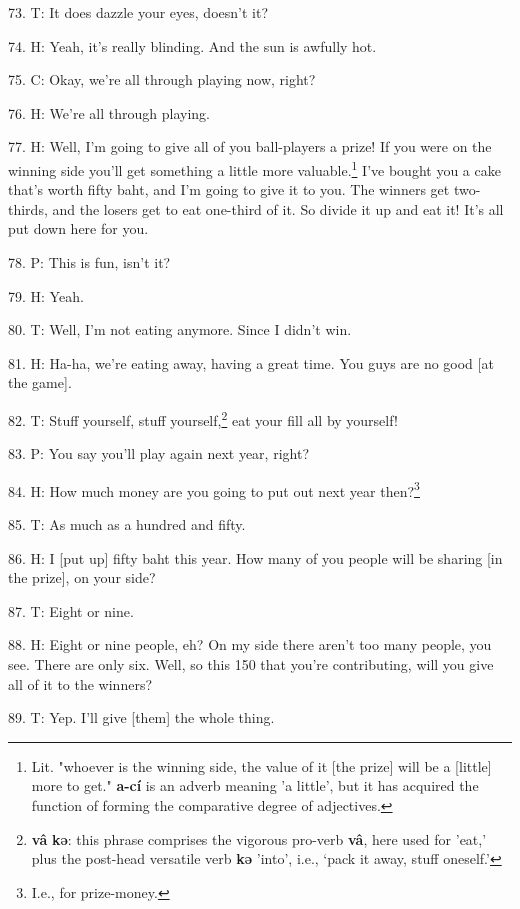 73. T:  It does
dazzle your eyes, doesn't it?

74. H: Yeah, it's really blinding. And the sun is awfully hot.

75. C: Okay, we're all through playing now, right?

76. H: We're all through playing.


77. H: Well, I'm going to give all of you ball-players a prize! If you were on the
winning side you'll get something a little more valuable.\footnote{Lit. "whoever is the winning side, the value of it [the prize] will be a [little] more to get." \textbf{a-cí} is an adverb meaning 'a little', but it has acquired the function of forming the comparative degree of adjectives.} I've bought you a
cake that's worth fifty baht, and I'm going to give it to you. The winners get
two-thirds, and the losers get to eat one-third of it. So divide it up and eat
it! It's all put down here for you.

78. P: This is fun, isn't it?

79. H: Yeah.

80. T: Well, I'm not eating anymore. Since I didn't win.

81. H: Ha-ha, we're eating away, having a great time. You guys are no good [at the
game].

82. T: Stuff yourself, stuff yourself,\footnote{\textbf{vâ} \textbf{kə}: this phrase comprises the vigorous pro-verb \textbf{vâ}, here used for 'eat,' plus the post-head versatile verb \textbf{kə} 'into', i.e., `pack it away, stuff oneself.'} eat your fill all by yourself!

83. P: You say you'll play again next year, right?

84. H: How much money are you going to put out next year then?\footnote{I.e., for prize-money.}

85. T: As much as a hundred and fifty.

86. H: I [put up] fifty baht this year. How many of you people will be sharing [in
the prize], on your side?

87. T: Eight or nine.

88. H: Eight or nine people, eh? On my side there aren't too many people, you see.
There are only six. Well, so this 150 that you're contributing, will you give all
of it to the winners?

89. T: Yep. I'll give [them] the whole thing.

